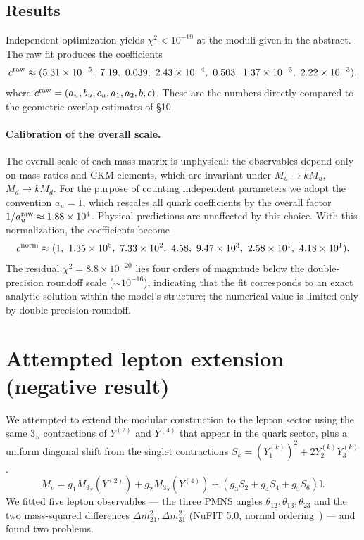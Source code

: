 \documentclass[12pt,a4paper]{article}
\numberwithin{equation}{section}
\begin{document}
\subsection{Results}
Independent optimization yields \(\chi^2 < 10^{-19}\) at the moduli given in the abstract.
The raw fit produces the coefficients
\begin{equation}
c^{\rm raw}\approx (5.31\times 10^{-5},\ 7.19,\ 0.039,\ 2.43\times 10^{-4},\ 0.503,\ 1.37\times 10^{-3},\ 2.22\times 10^{-3}),
\end{equation}
where \(c^{\rm raw}=(a_u,b_u,c_u,a_1,a_2,b,c)\). These are the numbers directly compared to the geometric overlap estimates of \S10.

\paragraph{Calibration of the overall scale.}
The overall scale of each mass matrix is unphysical: the observables depend only on mass ratios and CKM elements, which are invariant under \(M_u\to kM_u\), \(M_d\to kM_d\). For the purpose of counting independent parameters we adopt the convention \(a_u=1\), which rescales all quark coefficients by the overall factor \(1/a_u^{\rm raw}\approx 1.88\times 10^{4}\). Physical predictions are unaffected by this choice. With this normalization, the coefficients become
\begin{equation}
c^{\rm norm}\approx (1,\ 1.35\times 10^{5},\ 7.33\times 10^{2},\ 4.58,\ 9.47\times 10^{3},\ 2.58\times 10^{1},\ 4.18\times 10^{1}).
\end{equation}
The residual \(\chi^2 = 8.8\times 10^{-20}\) lies four orders of magnitude below the double-precision roundoff scale (\(\sim 10^{-16}\)), indicating that the fit corresponds to an exact analytic solution within the model's structure; the numerical value is limited only by double-precision roundoff.

\section{Attempted lepton extension (negative result)}
We attempted to extend the modular construction to the lepton sector using the same \(3_S\) contractions of \(Y^{(2)}\) and \(Y^{(4)}\) that appear in the quark sector, plus a uniform diagonal shift from the singlet contractions \(S_k = (Y_1^{(k)})^2 + 2Y_2^{(k)}Y_3^{(k)}\).
\begin{equation}
M_\nu = g_1 M_{3_S}(Y^{(2)}) + g_2 M_{3_S}(Y^{(4)}) + (g_3 S_2 + g_4 S_4 + g_5 S_6)\mathbb{I}.
\end{equation}
We fitted five lepton observables --- the three PMNS angles \(\theta_{12},\theta_{13},\theta_{23}\) and the two mass-squared differences \(\Delta m_{21}^2,\Delta m_{31}^2\) (NuFIT 5.0, normal ordering~\cite{NuFIT2020}) --- and found two problems.
\end{document}
